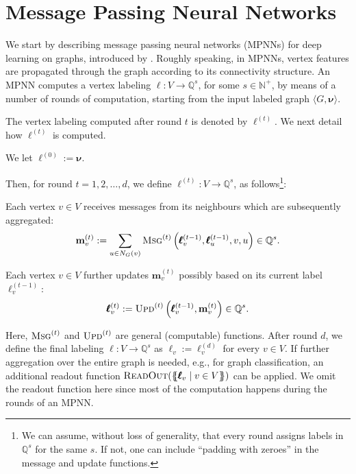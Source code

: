 
\section{Message Passing Neural Networks}
We start by describing message passing neural networks (MPNNs) for  deep learning on graphs, introduced by \cite{GilmerSRVD17}. Roughly speaking, in MPNNs, vertex features are propagated through the graph according to its connectivity structure. 
An MPNN computes a vertex labeling $\pmb{\ell}:V\to \mathbb{Q}^{s}$, for some $s\in\mathbb{N}^+$, by means of a number of rounds of computation, starting from the input labeled graph $\langle G,\pmb{\nu}\rangle$.

The vertex labeling computed after round $t$ is denoted by $\pmb{\ell}^{(t)}$. We next detail how $\pmb{\ell}^{(t)}$ is computed.
\begin{description}\setlength{\itemsep}{-0.4ex}
\item [Initialisation.]  We let $\pmb{\ell}^{(0)}:=\pmb{\nu}$.
\end{description}
Then, for round $t=1,2,\ldots,d$, we define $\pmb{\ell}^{(t)}:V\to\mathbb{Q}^{s}$, as follows\footnote{We can assume, without loss of generality, that every round assigns labels in $\mathbb{Q}^s$ for the same $s$. If not, one can include ``padding with zeroes'' in the message and update functions.}:
\begin{description}\setlength{\itemsep}{-0.4ex}
\item [Message Passing.] Each vertex $v\in V$ receives messages from its neighbours which are subsequently aggregated:
$$
\mathbf{m}^{(t)}_{v}:=\sum_{u\in N_G(v)}\textsc{Msg}^{(t)}\left(\pmb{\ell}^{(t-1)}_v,\pmb{\ell}^{(t-1)}_u,v,u\right)\in\mathbb{Q}^{s}.
$$
\item [Updating.] Each vertex $v\in V$ further updates $\mathbf{m}^{(t)}_{v}$ possibly based on its current label $\pmb{\ell}^{(t-1)}_v$:
$$
\pmb{\ell}^{(t)}_v:=\textsc{Upd}^{(t)}\left(\pmb{\ell}^{(t-1)}_v,\mathbf{m}^{(t)}_{v}\right)\in\mathbb{Q}^{s}.
$$
\end{description}
Here, $\textsc{Msg}^{(t)}$ and $\textsc{Upd}^{(t)}$ are general (computable) functions.
After round $d$, we define the final labeling $\pmb{\ell}:V\to\mathbb{Q}^{s}$ as  $\pmb{\ell}_v:=\pmb{\ell}^{(d)}_v$ for every $v\in V$. If further aggregation over the entire graph is needed, e.g., for graph classification, an additional readout function 
$\textsc{ReadOut}(\{\!\!\{\pmb{\ell}_v\mid v\in V\}\!\!\})$ can be applied. We omit the readout function here since most of the computation happens during the rounds of an MPNN.

